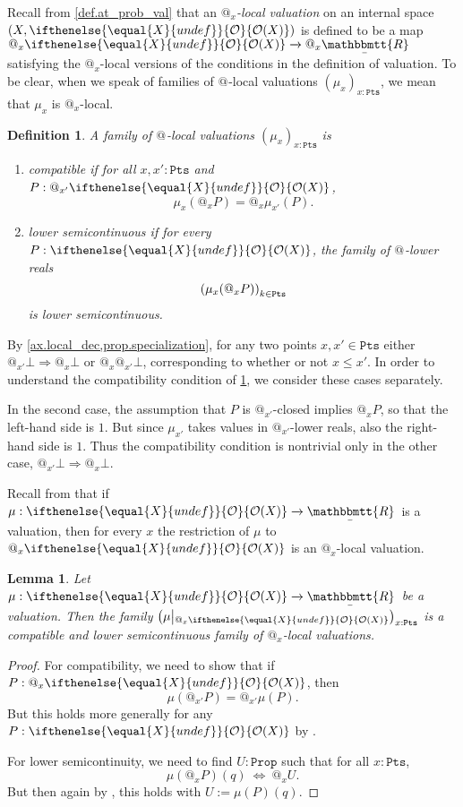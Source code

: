 \documentclass[reqno,11pt]{amsproc}
\makeatletter
\theoremstyle{plain}
\newtheorem{lemma}[theorem]{Lemma}
\newtheorem{definition}[theorem]{Definition}
\theoremstyle{definition}
\newcommand{\Const}[1]{\mathtt{#1}}
\renewcommand{\to}[1][]{\xrightarrow{#1}}
\newcommand{\ubar}[1]{\underaccent{\bar}{#1}}
\newcommand{\internal}[1]{\raisebox{-.03ex}{$\mathbbmtt{#1}$}}
\newcommand{\hs}{\hspace{1pt}}
\newcommand{\trr}{\internal{R}}
\newcommand{\tlrr}{\ubar{\trr}\hs}
\newcommand{\prop}{\Const{Prop}}
\newcommand{\pt}{x}
\newcommand{\Op}[1][undef]{\ifthenelse{\equal{#1}{undef}}{\mathcal{O}}{\mathcal{O}(#1)}}
\newcommand{\pts}{\mathtt{Pts}}		%
\newcommand{\rest}[2]{#1\big|\hspace{0in}_{#2}}
\newcommand{\atsymbol}{{@}}
\newcommand{\at}[1][\pt]{\atsymbol_{#1}}
\newcommand{\imp}{\Rightarrow}
\let\originalleft\left
\let\originalright\right
\renewcommand{\left}{\mathopen{}\mathclose\bgroup\originalleft}
\renewcommand{\right}{\aftergroup\egroup\originalright}
\numberwithin{equation}{section}
\makeatother
\begin{document}
Recall from \cref{def.at_prob_val} that an \emph{$\at$-local valuation} on an internal space $(X,\Op[X])$ is defined to be a map $\at \Op[X] \to \at \tlrr$ satisfying the $\at$-local versions of the conditions in the definition of valuation. To be clear, when we speak of families of $\at[]$-local valuations $(\mu_\pt)_{\pt : \pts}$, we mean that $\mu_\pt$ is $\at[\pt]$-local.

\begin{definition}\label{def.valuations_compatible_lowersemi}
	A family of $\at[]$-local valuations $(\mu_\pt)_{\pt : \pts}$ is
	\begin{enumerate}
		\item \emph{compatible} if for all $\pt, \pt' : \pts$ and $P : \at[\pt'] \Op[X]$,
			\[
				\mu_{\pt}(\at[\pt] P) = \at[\pt] \mu_{\pt'}(P).
			\]
		\item \emph{lower semicontinuous} if for every $P : \Op[X]$, the family of $\at[]$-lower reals
			\[
				\left( \mu_\pt(\at P) \right)_{k\in\pts}
			\]
			is lower semicontinuous.
	\end{enumerate}
\end{definition}

By \cref{ax.local_dec,prop.specialization}, for any two points $\pt,\pt'\in\pts$ either $\at[\pt']\bot\imp\at[\pt]\bot$ or $\at[\pt]\at[\pt']\bot$, corresponding to whether or not $\pt\le\pt'$. In order to understand the compatibility condition of \cref{def.valuations_compatible_lowersemi}, we consider these cases separately. 

In the second case, the assumption that $P$ is $\at[\pt']$-closed implies $\at[\pt] P$, so that the left-hand side is $1$. But since $\mu_{\pt'}$ takes values in $\at[\pt']$-lower reals, also the right-hand side is $1$. Thus the compatibility condition is nontrivial only in the other case, $\at[\pt'] \bot \imp \at[\pt] \bot$.

Recall from  that if $\mu : \Op[X] \to \tlrr$ is a valuation, then for every $\pt$ the restriction of $\mu$ to $\at \Op[X]$ is an $\at$-local valuation. 

\begin{lemma}\label{lemma.val_rests_compat_lowersemi}
	Let $\mu : \Op[X] \to \tlrr$ be a valuation. Then the family $\left( \rest{\mu}{\at \Op[X]} \right)_{\pt : \pts}$ is a compatible and lower semicontinuous family of $\at$-local valuations.
\end{lemma}

\begin{proof}
	For compatibility, we need to show that if $P : \at \Op[X]$, then
	\[
		\mu( \at[\pt'] P ) = \at[\pt'] \mu(P).
	\]
	But this holds more generally for any $P:\Op[X]$ by .

	For lower semicontinuity, we need to find $U : \prop$ such that for all $\pt : \pts$,
	\[
		\mu(\at P)(q) \: \Leftrightarrow \: \at U.
	\]
	But then again by , this holds with $U := \mu(P)(q)$.
\end{proof}
\end{document}

